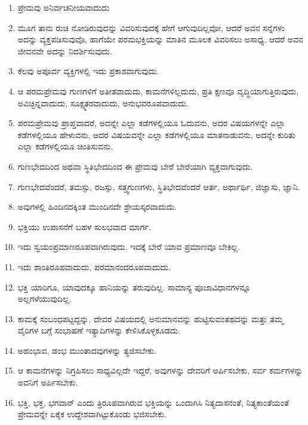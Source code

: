 \begin{enumerate}
\item ಪ್ರೇಮವು ಅನಿರ್ವಚನೀಯವಾದುದು

 \item ಮೂಗ ತಾನು ರುಚಿ ನೋಡಿರುವುದನ್ನು ವಿವರಿಸುವುದಕ್ಕೆ ಹೇಗೆ ಆಗುವುದಿಲ್ಲವೋ, ಆದರೆ ಅವನ ಸನ್ನೆಗಳು ಅದನ್ನು ವ್ಯಕ್ತಪಡಿಸುವುವೊ, ಹಾಗೆಯೇ ಪರಮಭಕ್ತಿಯನ್ನು ಮಾತಿನ ಮೂಲಕ ವಿವರಿಸಲು ಅಸಾಧ್ಯ. ಆದರೆ ಅವನ ಜೀವನವೇ ಅದನ್ನು ನಿದರ್ಶಿಸುವುದು.

 \item ಕೆಲವು ಅಪೂರ್ವ ವ್ಯಕ್ತಿಗಳಲ್ಲಿ ಇದು ಪ್ರಕಾಶವಾಗುವುದು.

 \item ಆ ಪರಮಪ್ರೇಮವು ಗುಣಗಳಿಗೆ ಅತೀತವಾದುದು, ಕಾಮನೆಗಳಿಲ್ಲದುದು, ಪ್ರತಿ ಕ್ಷಣವೂ ವೃದ್ಧಿಯಾಗುತ್ತಿರುವುದು, ಅವಿಚ್ಛಿನ್ನವಾದುದು, ಸೂಕ್ಷ್ಮತರವಾದುದು, ಅನುಭವರೂಪವಾದುದು.

 \item ಪರಮಪ್ರೇಮವು ಪ್ರಾಪ್ತವಾದರೆ, ಅದನ್ನೇ ಎಲ್ಲಾ ಕಡೆಗಳಲ್ಲಿಯೂ ಓದುವನು, ಅದರ ವಿಷಯಗಳನ್ನೇ ಎಲ್ಲಾ ಕಡೆಗಳಲ್ಲಿಯೂ ಹೇಳುವನು, ಅದರ ವಿಷಯವನ್ನೇ ಎಲ್ಲಾ ಕಡೆಗಳಲ್ಲಿಯೂ ಮಾತನಾಡುವನು, ಅದನ್ನೇ ಕುರಿತು ಎಲ್ಲಾ ಕಡೆಗಳಲ್ಲಿಯೂ ಚಿಂತಿಸುವನು.

 \item ಗುಣಭೇದದಿಂದ ಅಥವಾ ಸ್ಥಿತಿಭೇದದಿಂದ ಈ ಪ್ರೇಮವು ಬೇರೆ ಬೇರೆಯಾಗಿ ವ್ಯಕ್ತವಾಗುವುದು.

 \item ಗುಣಭೇದವೆಂದರೆ, ತಮಸ್ಸು, ರಜಸ್ಸು, ಸತ್ತ್ವಗುಣಗಳು, ಸ್ಥಿತಿಭೇದವೆಂದರೆ ಆರ್ತ, ಅರ್ಥಾರ್ಥಿ, ಜಿಜ್ಞಾಸು, ಜ್ಞಾನಿ.

 \item ಅವುಗಳಲ್ಲಿ ಹಿಂದಿನದಕ್ಕಿಂತ ಮುಂದಿನದೇ ಶ್ರೇಯಸ್ಕರವಾದುದು.

 \item ಭಕ್ತಿಯು ಉಪಾಸನೆಗೆ ಬಹಳ ಸುಲಭವಾದ ಮಾರ್ಗ.

 \item ಇದು ಸ್ವಯಂಪ್ರಮಾಣರೂಪವಾಗಿರುವುದು. ಇದಕ್ಕೆ ಬೇರೆ ಯಾವ ಪ್ರಮಾಣವೂ ಬೇಕಿಲ್ಲ.

 \item ಇದು ಶಾಂತಿರೂಪವಾದುದು, ಪರಮಾನಂದರೂಪವಾದುದು.

 \item ಭಕ್ತಿ ಯಾರಿಗೂ, ಯಾವುದಕ್ಕೂ ಹಾನಿಯನ್ನು ತರುವುದಿಲ್ಲ. ಸಾಮಾನ್ಯ ಪೂಜಾವಿಧಾನಗಳನ್ನೂ ಅಲ್ಲಗಳೆಯುವುದಿಲ್ಲ.

 \item ಕಾಮಕ್ಕೆ ಸಂಬಂಧಪಟ್ಟದ್ದನ್ನು, ದೇವರ ವಿಷಯದಲ್ಲಿ ಅನುಮಾನವನ್ನು ಹುಟ್ಟಿಸುವಂತಹದನ್ನು ಮತ್ತು ತಮ್ಮ ವೈರಿಗಳ ಬಗ್ಗೆ ಸಂಭಾಷಣೆ ಇತ್ಯಾದಿಗಳನ್ನು ಕೇಳಿಸಿಕೊಳ್ಳಕೂಡದು.

 \item ಅಹಂಭಾವ, ಡಂಭ ಮುಂತಾದವುಗಳನ್ನು ತ್ಯಜಿಸಬೇಕು.

 \item ಆ ಕಾಮನೆಗಳನ್ನು ನಿಗ್ರಹಿಸಲು ಸಾಧ್ಯವಿಲ್ಲದೇ ಇದ್ದರೆ, ಅವುಗಳನ್ನು ದೇವರಿಗೆ ಅರ್ಪಿಸಬೇಕು, ಸರ್ವ ಕರ್ಮಗಳನ್ನು ಅವನಿಗೆ ಅರ್ಪಿಸಬೇಕು.

 \item ಭಕ್ತಿ, ಭಕ್ತ, ಭಗವಾನ್​ ಎಂದು ತ್ರಿರೂಪವಾಗಿರುವ ಭಕ್ತಿಯನ್ನು ಒಂದಾಗಿಸಿ ನಿತ್ಯದಾಸನಂತೆ, ನಿತ್ಯಕಾಂತೆಯಂತೆ ಪ್ರೇಮವನ್ನೇ ಏಕೈಕ ಉದ್ದೇಶವಾಗಿಟ್ಟುಕೊಂಡು ಭಜಿಸಬೇಕು.

\end{enumerate}

